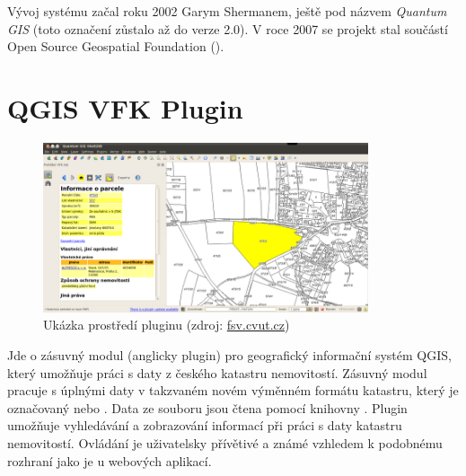 Vývoj systému začal roku 2002 Garym Shermanem, ještě pod názvem
\textit {Quantum GIS} (toto označení zůstalo až do verze 2.0). V roce
2007 se projekt stal součástí Open Source Geospatial Foundation
(). \cite{qgis_official, qgis_wiki_en, qgis_wiki_cz}
 
\section{QGIS VFK Plugin}
\begin{figure}[H]
	 \centering
      \includegraphics[height=5cm]{./pictures/Qgisvfkplugin.png}
      \caption{Ukázka prostředí pluginu (zdroj:
\href{http://freegis.fsv.cvut.cz/wiki/images/4/4b/Qgisvfkplugin-screenshot-05.png}{fsv.cvut.cz})}
      \label{fig:qgis_vfk_plugin}
  \end{figure}

Jde o zásuvný modul (anglicky plugin) pro geografický informační systém
QGIS, který umožňuje práci s daty z českého katastru
nemovitostí. Zásuvný modul pracuje s úplnými daty v takzvaném novém
výměnném formátu katastru, který je označovaný  nebo
. Data ze souboru jsou čtena pomocí knihovny . Plugin
umožňuje vyhledávání a zobrazování informací při práci s daty katastru
nemovitostí. Ovládání je uživatelsky přívětivé a známé vzhledem k
podobnému rozhraní jako je u webových aplikací.

